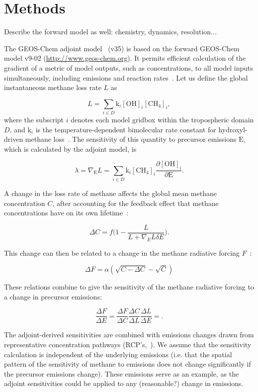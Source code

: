 \section{Methods}

Describe the forward model as well: chemistry, dynamics, resolution...

The GEOS-Chem adjoint model~\cite{ref:henze2007} (v35) is based on the forward GEOS-Chem model v9-02 (\url{http://www.geos-chem.org}). It permits efficient calculation of the gradient of a metric of model outputs, such as concentrations, to all model inputs simultaneously, including emissions and reaction rates~\cite{ref:walker2015}. Let us define the global instantaneous methane loss rate $L$ as

\begin{equation}
L=\sum_{i \in D} \mathrm{k}_i \mathrm{[OH]}_i \mathrm{[CH_4]}_i,
\end{equation}
where the subscript $i$ denotes each model gridbox within the tropospheric domain $D$, and $\mathrm{k}_i$ is the temperature-dependent bimolecular rate constant for hydroxyl-driven methane loss~\citep{ref:sander2011}. The sensitivity of this quantity to precursor emissions $\mathrm{E}$, which is calculated by the adjoint model, is

\begin{equation}
\lambda = \nabla_\mathrm{E} L = \sum_{i \in D} \mathrm{k}_i \mathrm{[CH_4]}_i \frac{\partial \mathrm{[OH]_i}}{\partial \mathrm{E}}.
\end{equation}

A change in the loss rate of methane affects the global mean methane concentration $C$, after accounting for the feedback effect that methane concentrations have on its own lifetime~\citep{ref:naik2005}:

\begin{equation}
\Delta C = f\big(1 - \frac{L}{L+\nabla_E L \delta E}\big).
\end{equation}

This change can then be related to a change in the methane radiative forcing $F$~\citep{ref:myhre1998}:

\begin{equation}
\Delta F = \alpha (\sqrt{C-\Delta C} - \sqrt{C})
\end{equation}

These relations combine to give the sensitivity of the methane radiative forcing to a change in precursor emissions:

\begin{equation}
\frac{\Delta F}{\Delta E} = \frac{\Delta F}{\Delta C} \frac{\Delta C}{\Delta L} \frac{\Delta L}{\Delta E} = .
\end{equation}

The adjoint-derived sensitivities are combined with emissions changes drawn from representative concentration pathways (RCP's,~\citet{ref:vanvuuren2011}). We assume that the sensitivity calculation is independent of the underlying emissions (i.e. that the spatial pattern of the sensitivity of methane to emissions does not change significantly if the precursor emissions change). These emissions serve as an example, as the adjoint sensitivities could be applied to any (reasonable?) change in emissions.